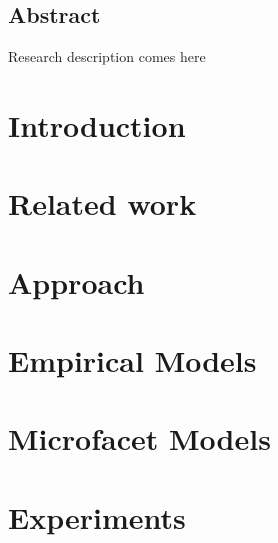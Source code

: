 \documentclass[12pt, a4paper,oneside]{book}
\begin{document}
	\section*{Abstract}
		Research description comes here
	\newpage
	\tableofcontents
	\newpage
	\hypersetup{pageanchor=true}
	\chapter{Introduction}
	
	\chapter{Related work}
	
	\chapter{Approach}
	
	\chapter{Empirical Models}
	
	\chapter{Microfacet Models}
	
	\chapter{Experiments}
	
 	\nocite{*}
	
	
	\printindex
\end{document}
